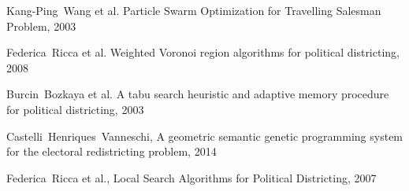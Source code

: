 \documentclass[journal]{IEEEtran}
\begin{document}
\begin{thebibliography}{1}

Kang-Ping~Wang et al. Particle Swarm Optimization for Travelling Salesman
        Problem, 2003

Federica~Ricca et al. Weighted Voronoi region algorithms for political
        districting, 2008

    Burcin~Bozkaya et al.  A tabu search heuristic and adaptive memory procedure
        for political districting, 2003

    Castelli~Henriques~Vanneschi, A geometric semantic genetic programming system for the electoral redistricting problem, 2014

    Federica~Ricca et al., Local Search Algorithms for Political Districting, 2007

\end{thebibliography}
\end{document}

